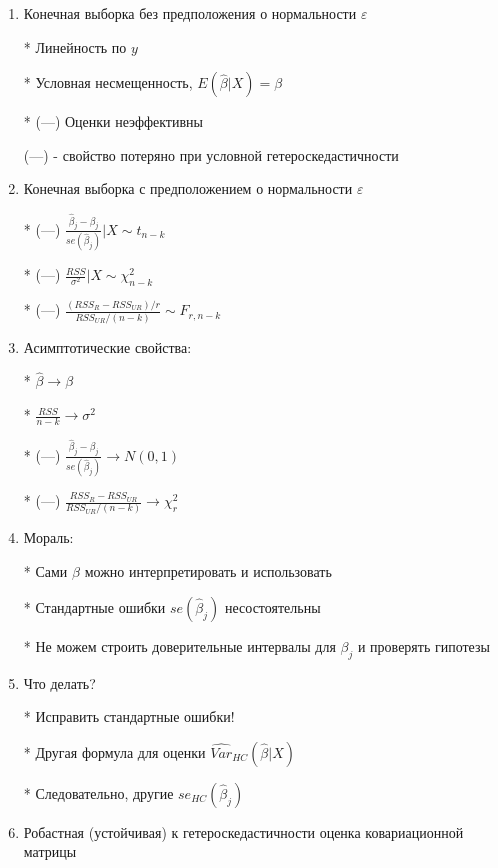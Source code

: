 \documentclass[12pt,a4paper]{article}
\begin{document}
{\begin{enumerate}
- конечная выборка с предположением о нормальности $\varepsilon$

- асимптотические свойства (без предположения о нормальности  $\varepsilon$)

Что происходит в каждом случае?

\item Конечная выборка без предположения о нормальности $\varepsilon$

* Линейность по $y$

* Условная несмещенность, $E(\hat{\beta}|X)=\beta$

* (---) Оценки неэффективны

(---) - свойство потеряно при условной гетероскедастичности

\newpage
\item  Конечная выборка с предположением о нормальности $\varepsilon$

* (---) $\frac{\hat{\beta}_j-\beta_j}{se(\hat{\beta}_j)} | X \sim t_{n-k}$

* (---) $\frac{RSS}{\sigma^2} |X \sim \chi^2_{n-k}$

* (---) $\frac{(RSS_R-RSS_{UR})/r}{RSS_{UR}/(n-k)} \sim F_{r,n-k}$

\item  Асимптотические свойства:

*  $\hat{\beta} \to \beta $

* $\frac{RSS}{n-k} \to \sigma^2 $

* (---) $\frac{\hat{\beta}_j-\beta_j}{se(\hat{\beta}_j)} \to N(0,1)$

* (---) $\frac{RSS_R-RSS_{UR}}{RSS_{UR}/(n-k)} \to \chi^2_r$

\newpage
\item Мораль:

* Сами $\hat{\beta}$ можно интерпретировать и использовать

* Стандартные ошибки $se(\hat{\beta}_j)$ несостоятельны

* Не можем строить доверительные интервалы для $\beta_j$ и проверять гипотезы

\item Что делать?

* Исправить стандартные ошибки! 

* Другая формула для оценки $\widehat{Var}_{HC}(\hat{\beta}|X)$

* Следовательно, другие $se_{HC}(\hat{\beta}_j)$


\item Робастная (устойчивая) к гетероскедастичности оценка ковариационной матрицы


\end{enumerate}}
\end{document}
